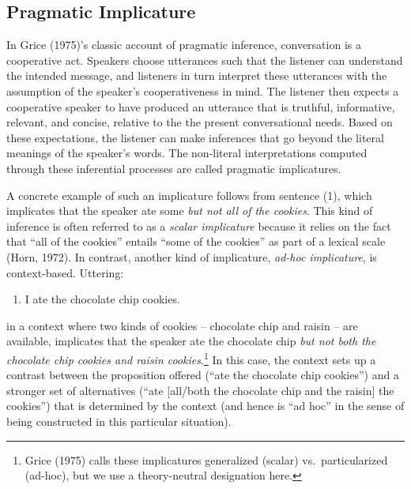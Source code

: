 \documentclass[man]{apa6}
\providecommand{\tightlist}{%
  \setlength{\itemsep}{0pt}\setlength{\parskip}{0pt}}
\begin{document}
\subsection{Pragmatic Implicature}\label{pragmatic-implicature}

In Grice (1975)'s classic account of pragmatic inference, conversation
is a cooperative act. Speakers choose utterances such that the listener
can understand the intended message, and listeners in turn interpret
these utterances with the assumption of the speaker's cooperativeness in
mind. The listener then expects a cooperative speaker to have produced
an utterance that is truthful, informative, relevant, and concise,
relative to the the present conversational needs. Based on these
expectations, the listener can make inferences that go beyond the
literal meanings of the speaker's words. The non-literal interpretations
computed through these inferential processes are called pragmatic
implicatures.

A concrete example of such an implicature follows from sentence (1),
which implicates that the speaker ate some \emph{but not all of the
cookies}. This kind of inference is often referred to as a \emph{scalar
implicature} because it relies on the fact that \enquote{all of the
cookies} entails \enquote{some of the cookies} as part of a lexical
scale (Horn, 1972). In contrast, another kind of implicature,
\emph{ad-hoc implicature}, is context-based. Uttering:

\begin{enumerate}
\def\labelenumi{(\arabic{enumi})}
\setcounter{enumi}{1}
\tightlist
\item
  I ate the chocolate chip cookies.
\end{enumerate}

\noindent in a context where two kinds of cookies -- chocolate chip and
raisin -- are available, implicates that the speaker ate the chocolate
chip \emph{but not both the chocolate chip cookies and raisin
cookies}.\footnote{Grice (1975) calls these implicatures generalized
  (scalar) vs.~particularized (ad-hoc), but we use a theory-neutral
  designation here.} In this case, the context sets up a contrast
between the proposition offered (\enquote{ate the chocolate chip
cookies}) and a stronger set of alternatives (\enquote{ate {[}all/both
the chocolate chip and the raisin{]} the cookies}) that is determined by
the context (and hence is \enquote{ad hoc} in the sense of being
constructed in this particular situation).
\end{document}
